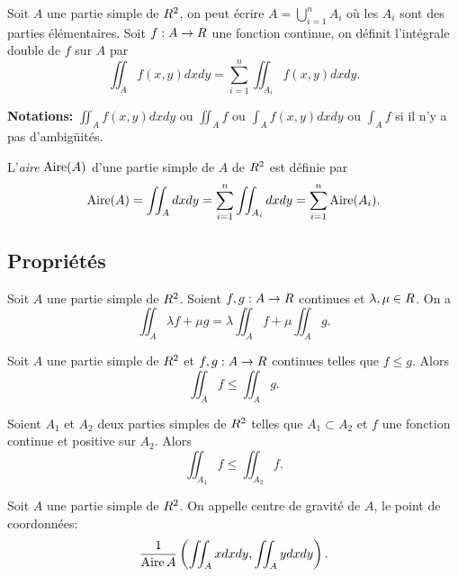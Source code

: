 \begin{definition}
	Soit $A$ une partie simple de $R^2$, on peut écrire $A = \bigcup_{i=1}^n A_i$ où les $A_i$ sont des parties élémentaires. Soit $f:A \to R$ une fonction continue, on définit l'intégrale double de $f$ sur $A$ par 
\[
	\iint_A f(x,y) dx dy =  \sum_{i=1}^n \iint_{A_i} f(x,y) dx dy.
\]
\end{definition}

{\bf\sffamily Notations:} $\iint_A f(x,y) dx dy$ ou $\iint_A f  $ ou $	\int_A f(x,y) dx dy  $ ou $ \int_A f$ si il n'y a pas d'ambigüités.


\begin{exemple}
	\pl{\rep{6cm}}
\end{exemple}

\begin{definition}
	L'\emph{aire} $\operatorname{Aire}(A)$ d'une partie simple de $A$ de $R^2$ est définie par 
	\[
		\operatorname{Aire} (A) = \iint_A dx dy =  \sum_{i=1}^n \iint_{A_i} dx dy = \sum_{i=1}^n \operatorname{Aire}(A_i).
	\]
\end{definition}

\sld{\vfill\pagebreak[5]}%

\subsection{Propriétés}

\begin{proposition}
	[(Linéarité)]
	Soit $A$ une partie simple de $R^2$. Soient $f,g:A \to R$ continues et $\lambda,\mu\in R$. On a 
	\[
		\iint_A \lambda f+ \mu g= \lambda \iint_A f+  \mu \iint_A g.
	\]
\end{proposition}


\begin{proposition}
	[(Croissance)]
	Soit $A$ une partie simple de $R^2$ et $f,g:A \to R$ continues telles que $f\leq g$. Alors 
	\[
		\iint_A f \leq \iint_A g.
	\]
\end{proposition}

\begin{proposition}
	Soient $A_1$ et $A_2$ deux parties simples de $R^2$ telles que $A_1 \subset A_2$ et $f$ une fonction continue et positive sur $A_2$. Alors
	\[
		\iint_{A_1} f\leq \iint_{A_2} f.
	\]
\end{proposition}

\begin{definition}
	Soit  $A$  une partie simple de $R^2$. On appelle centre de gravité de $A$, le point de coordonnées:
	\[
            \frac{1}{\operatorname{Aire} A} \left( \iint_A x dxdy, \iint_A y dxdy \right).
	\]
\end{definition}

